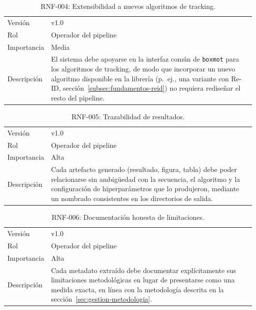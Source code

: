 \begin{table}[htp]
\centering
\caption{RNF-004: Extensibilidad a nuevos algoritmos de tracking.}
\label{tab:rnf-004}
\renewcommand{\arraystretch}{1.2}
\begin{tabular}{|p{3.1cm}|p{9.2cm}|}
\hline
\rowcolor{gray!25}
\multicolumn{2}{|l|}{\textbf{RNF-004 -- Extensibilidad a nuevos algoritmos de tracking}} \\
\hline
Versión & v1.0 \\
\hline
Rol & Operador del pipeline \\
\hline
Importancia & Media \\
\hline
Descripción & El sistema debe apoyarse en la interfaz común de
  \texttt{boxmot} para los algoritmos de tracking, de modo que incorporar
  un nuevo algoritmo disponible en la librería (p.\ ej., una variante con
  Re-ID, sección~\ref{subsec:fundamentos-reid}) no requiera rediseñar el
  resto del pipeline. \\
\hline
\end{tabular}
\end{table}

\begin{table}[htp]
\centering
\caption{RNF-005: Trazabilidad de resultados.}
\label{tab:rnf-005}
\renewcommand{\arraystretch}{1.2}
\begin{tabular}{|p{3.1cm}|p{9.2cm}|}
\hline
\rowcolor{gray!25}
\multicolumn{2}{|l|}{\textbf{RNF-005 -- Trazabilidad de resultados}} \\
\hline
Versión & v1.0 \\
\hline
Rol & Operador del pipeline \\
\hline
Importancia & Alta \\
\hline
Descripción & Cada artefacto generado (resultado, figura, tabla) debe poder
  relacionarse sin ambigüedad con la secuencia, el algoritmo y la
  configuración de hiperparámetros que lo produjeron, mediante un
  nombrado consistentes en los directorios de salida. \\
\hline
\end{tabular}
\end{table}

\begin{table}[htp]
\centering
\caption{RNF-006: Documentación honesta de limitaciones.}
\label{tab:rnf-006}
\renewcommand{\arraystretch}{1.2}
\begin{tabular}{|p{3.1cm}|p{9.2cm}|}
\hline
\rowcolor{gray!25}
\multicolumn{2}{|l|}{\textbf{RNF-006 -- Documentación honesta de limitaciones}} \\
\hline
Versión & v1.0 \\
\hline
Rol & Operador del pipeline \\
\hline
Importancia & Alta \\
\hline
Descripción & Cada metadato extraído debe
  documentar explícitamente sus limitaciones metodológicas en lugar de
  presentarse como una medida exacta, en línea con la metodología descrita
  en la sección~\ref{sec:gestion-metodologia}. \\
\hline
\end{tabular}
\end{table}


